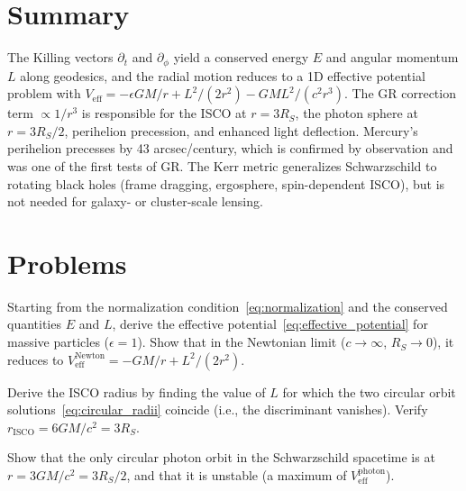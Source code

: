 \section{Summary}
\label{sec:geodesics_summary}

The Killing vectors $\partial_t$ and $\partial_\phi$ yield a conserved
energy $E$ and angular momentum $L$ along geodesics, and the radial
motion reduces to a 1D effective potential problem with
$V_{\mathrm{eff}} = -\epsilon GM/r + L^2/(2r^2) - GML^2/(c^2 r^3)$.
The GR correction term $\propto 1/r^3$ is responsible for the
ISCO at $r = 3R_S$, the photon sphere at $r = 3R_S/2$, perihelion
precession, and enhanced light deflection.
Mercury's perihelion precesses by 43 arcsec/century, which is confirmed
by observation and was one of the first tests of GR.
The Kerr metric generalizes Schwarzschild to rotating black holes
(frame dragging, ergosphere, spin-dependent ISCO), but is not
needed for galaxy- or cluster-scale lensing.


\section{Problems}
\label{sec:geodesics_problems}

\begin{exercise}
\label{ex:derive_veff}
Starting from the normalization condition~\eqref{eq:normalization} and the
conserved quantities $E$ and $L$, derive the effective
potential~\eqref{eq:effective_potential} for massive particles
($\epsilon = 1$).  Show that in the Newtonian limit ($c \to \infty$,
$R_S \to 0$), it reduces to
$V_{\mathrm{eff}}^{\mathrm{Newton}} = -GM/r + L^2/(2r^2)$.
\end{exercise}

\begin{exercise}
\label{ex:isco_derivation}
Derive the ISCO radius by finding the value of $L$ for which the two
circular orbit solutions~\eqref{eq:circular_radii} coincide (i.e., the
discriminant vanishes).  Verify $r_{\mathrm{ISCO}} = 6GM/c^2 = 3R_S$.
\end{exercise}

\begin{exercise}
\label{ex:photon_sphere_derivation}
Show that the only circular photon orbit in the Schwarzschild spacetime is
at $r = 3GM/c^2 = 3R_S/2$, and that it is unstable (a maximum of
$V_{\mathrm{eff}}^{\mathrm{photon}}$).
\end{exercise}

